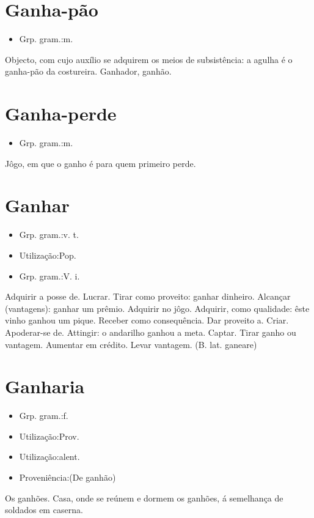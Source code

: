 \section{Ganha-pão}
\begin{itemize}
\item {Grp. gram.:m.}
\end{itemize}
Objecto, com cujo auxílio se adquirem os meios de subsistência: \textunderscore a agulha é o ganha-pão da costureira\textunderscore .
Ganhador, ganhão.
\section{Ganha-perde}
\begin{itemize}
\item {Grp. gram.:m.}
\end{itemize}
Jôgo, em que o ganho é para quem primeiro perde.
\section{Ganhar}
\begin{itemize}
\item {Grp. gram.:v. t.}
\end{itemize}
\begin{itemize}
\item {Utilização:Pop.}
\end{itemize}
\begin{itemize}
\item {Grp. gram.:V. i.}
\end{itemize}
Adquirir a posse de.
Lucrar.
Tirar como proveito: \textunderscore ganhar dinheiro\textunderscore .
Alcançar (vantagens): \textunderscore ganhar um prêmio\textunderscore .
Adquirir no jôgo.
Adquirir, como qualidade: \textunderscore êste vinho ganhou um pique\textunderscore .
Receber como consequência.
Dar proveito a.
Criar.
Apoderar-se de.
Attingir: \textunderscore o andarilho ganhou a meta\textunderscore .
Captar.
Tirar ganho ou vantagem.
Aumentar em crédito.
Levar vantagem.
(B. lat. \textunderscore ganeare\textunderscore )
\section{Ganharia}
\begin{itemize}
\item {Grp. gram.:f.}
\end{itemize}
\begin{itemize}
\item {Utilização:Prov.}
\end{itemize}
\begin{itemize}
\item {Utilização:alent.}
\end{itemize}
\begin{itemize}
\item {Proveniência:(De \textunderscore ganhão\textunderscore )}
\end{itemize}
Os ganhões.
Casa, onde se reúnem e dormem os ganhões, á semelhança de soldados em caserna.
